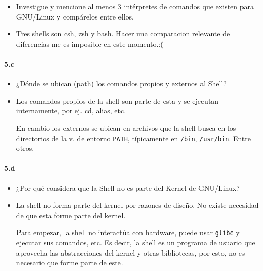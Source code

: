 \documentclass[10pt,a4paper]{paper}
\begin{document}
	\begin{itemize}
		\item Investigue y mencione al menos 3 intérpretes de comandos que existen para
		GNU/Linux y compárelos entre ellos.
		
		
		\item Tres shells son csh, zsh y bash. Hacer una comparacion relevante de
		diferencias me es imposible en este momento.:(
	\end{itemize}
	
	
	
	\paragraph{5.c}
	
	\begin{itemize}
		\item ¿Dónde se ubican (path) los comandos propios y externos al Shell?
		
		\item Los comandos propios de la shell son parte de esta y se ejecutan
		internamente,  por ej. cd, alias, etc. 
		
		
		En cambio los externos se ubican en archivos que la shell busca en los
		directorios de la v. de entorno \texttt{PATH}, típicamente en \texttt{/bin},
		\texttt{/usr/bin}. Entre otros.
		
		
	\end{itemize}
	
	
	\paragraph{5.d}
	
	\begin{itemize}
		\item ¿Por qué considera que la Shell no es parte del Kernel de GNU/Linux?
		
		\item La shell no forma parte del kernel por razones de diseño. No existe
		necesidad de que esta forme parte del kernel. 
		
		Para empezar, la shell no interactúa con hardware, puede usar \texttt{glibc} y
		ejecutar sus comandos, etc. Es decir, la shell es un programa de usuario que
		aprovecha las abstracciones del kernel y otras bibliotecas, por esto, no es
		necesario que forme parte de este.	
	\end{itemize}
	
	
	
	
	
\end{document}
